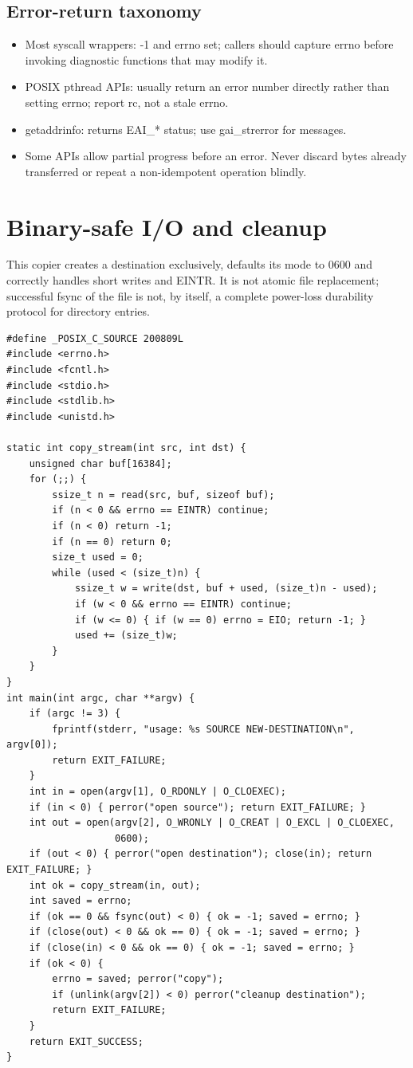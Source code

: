 \documentclass[11pt,letterpaper,oneside]{report}
\begin{document}
\section{Error-return taxonomy}
\begin{itemize}
\item Most syscall wrappers: -1 and errno set; callers should capture errno before invoking diagnostic functions that may modify it.
\item POSIX pthread APIs: usually return an error number directly rather than setting errno; report rc, not a stale errno.
\item getaddrinfo: returns EAI\_* status; use gai\_strerror for messages.
\item Some APIs allow partial progress before an error. Never discard bytes already transferred or repeat a non-idempotent operation blindly.
\end{itemize}
\chapter{Binary-safe I/O and cleanup}
This copier creates a destination exclusively, defaults its mode to 0600 and correctly handles short writes and EINTR. It is not atomic file replacement; successful fsync of the file is not, by itself, a complete power-loss durability protocol for directory entries.

\begin{lstlisting}
#define _POSIX_C_SOURCE 200809L
#include <errno.h>
#include <fcntl.h>
#include <stdio.h>
#include <stdlib.h>
#include <unistd.h>

static int copy_stream(int src, int dst) {
    unsigned char buf[16384];
    for (;;) {
        ssize_t n = read(src, buf, sizeof buf);
        if (n < 0 && errno == EINTR) continue;
        if (n < 0) return -1;
        if (n == 0) return 0;
        size_t used = 0;
        while (used < (size_t)n) {
            ssize_t w = write(dst, buf + used, (size_t)n - used);
            if (w < 0 && errno == EINTR) continue;
            if (w <= 0) { if (w == 0) errno = EIO; return -1; }
            used += (size_t)w;
        }
    }
}
int main(int argc, char **argv) {
    if (argc != 3) {
        fprintf(stderr, "usage: %s SOURCE NEW-DESTINATION\n", argv[0]);
        return EXIT_FAILURE;
    }
    int in = open(argv[1], O_RDONLY | O_CLOEXEC);
    if (in < 0) { perror("open source"); return EXIT_FAILURE; }
    int out = open(argv[2], O_WRONLY | O_CREAT | O_EXCL | O_CLOEXEC,
                   0600);
    if (out < 0) { perror("open destination"); close(in); return EXIT_FAILURE; }
    int ok = copy_stream(in, out);
    int saved = errno;
    if (ok == 0 && fsync(out) < 0) { ok = -1; saved = errno; }
    if (close(out) < 0 && ok == 0) { ok = -1; saved = errno; }
    if (close(in) < 0 && ok == 0) { ok = -1; saved = errno; }
    if (ok < 0) {
        errno = saved; perror("copy");
        if (unlink(argv[2]) < 0) perror("cleanup destination");
        return EXIT_FAILURE;
    }
    return EXIT_SUCCESS;
}
\end{lstlisting}
\end{document}
